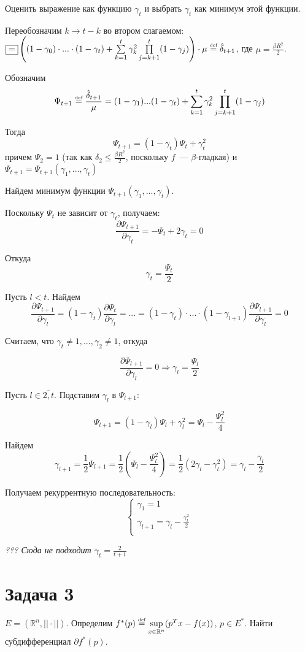 \documentclass[a4paper]{article}
\def\eqdef{\overset{\mbox{\tiny def}}{=}}
\begin{document}
Оценить выражение как функцию $\gamma_t$ и выбрать $\gamma_t$ как минимум этой функции.

Переобозначим $k\to t-k$ во втором слагаемом: $\boxed{=}\left((1-\gamma_0)\cdot...\cdot(1-\gamma_t)+\sum\limits_{k=1}^t\gamma_k^2\prod\limits_{j=k+1}^t(1-\gamma_j)\right)\cdot \mu\eqdef \hat{\delta}_{t+1}$, где $\mu=\frac{\beta R^2}{2}$.

Обозначим
$$\Psi_{t+1}\eqdef \frac{\hat{\delta}_{t+1}}{\mu}=(1-\gamma_1)...(1-\gamma_t)+\sum\limits_{k=1}^t\gamma_k^2\prod\limits_{j=k+1}^{t}(1-\gamma_j)$$

Тогда $$\Psi_{t+1}=(1-\gamma_t)\Psi_t+\gamma_t^2$$
причем $\Psi_2=1$ (так как $\delta_2\leqslant \frac{\beta R^2}{2}$, поскольку $f$~--- $\beta$-гладкая) и $\Psi_{t+1}=\Psi_{t+1}(\gamma_1,...,\gamma_t)$

Найдем минимум функции $\Psi_{t+1}(\gamma_1,...,\gamma_t)$.

Поскольку $\Psi_t$ не зависит от $\gamma_t$, получаем:
$$\frac{\partial \Psi_{t+1}}{\partial \gamma_t}=-\Psi_t+2\gamma_t=0$$

Откуда $$\gamma_t=\frac{\Psi_t}{2}$$

Пусть $l<t$. Найдем $$\frac{\partial \Psi_{t+1}}{\partial \gamma_l}=(1-\gamma_t)\frac{\partial \Psi_{t}}{\partial \gamma_l}=...=(1-\gamma_t)\cdot...\cdot(1-\gamma_{l+1})\frac{\partial \Psi_{l+1}}{\partial \gamma_l}=0$$

Считаем, что $\gamma_t\neq 1,...,\gamma_2\neq 1$, откуда

$$\frac{\partial \Psi_{l+1}}{\partial \gamma_l}=0\Rightarrow \gamma_l=\frac{\Psi_l}{2}$$

Пусть $l\in \overline{2,t}$. Подставим $\gamma_l$ в $\Psi_{l+1}$:

$$\Psi_{l+1}=(1-\gamma_l)\Psi_{l}+\gamma_l^2=\Psi_l-\frac{\Psi_l^2}{4}$$

Найдем $$\gamma_{l+1}=\frac{1}{2}\Psi_{l+1}=\frac{1}{2}(\Psi_l-\frac{\Psi_l^2}{4})=\frac{1}{2}(2\gamma_l-\gamma_l^2)=\gamma_l-\frac{\gamma_l}{2}$$

Получаем рекуррентную последовательность:
$$
\begin{cases}
\gamma_1 = 1\\
\gamma_{l+1}=\gamma_l-\frac{\gamma_l^2}{2}\\
\end{cases}
$$

{\em ??? Сюда не подходит $\gamma_t=\frac{2}{t+1}$}
\section*{Задача 3}
$E=(\mathbb{R}^n,||\cdot||)$. Определим $f^*(p)\eqdef\sup\limits_{x\in\mathbb{R}^n}(p^Tx-f(x))$, $p\in E^*$. Найти субдифференциал $\partial f^*(p)$.
\end{document}
